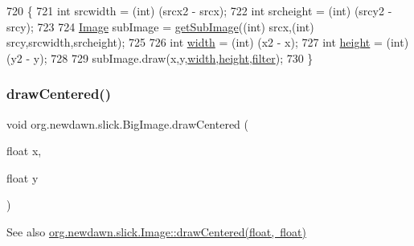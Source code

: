 \begin{DoxyCode}
720                                                                 \{   
721         \textcolor{keywordtype}{int} srcwidth = (int) (srcx2 - srcx);
722         \textcolor{keywordtype}{int} srcheight = (int) (srcy2 - srcy);
723 
724         \mbox{\hyperlink{classorg_1_1newdawn_1_1slick_1_1_image_a2c047fa669a8387f6c2d9bde33b3ee04}{Image}} subImage = \mbox{\hyperlink{classorg_1_1newdawn_1_1slick_1_1_big_image_a9384aa6b99cc0b45947a5b66bf2ab19c}{getSubImage}}((\textcolor{keywordtype}{int}) srcx,(\textcolor{keywordtype}{int}) srcy,srcwidth,srcheight);
725 
726         \textcolor{keywordtype}{int} \mbox{\hyperlink{classorg_1_1newdawn_1_1slick_1_1_image_a7d02c85e21b388428cfe5cc5c82714a1}{width}} = (int) (x2 - x);
727         \textcolor{keywordtype}{int} \mbox{\hyperlink{classorg_1_1newdawn_1_1slick_1_1_image_a54397a37823bc59ddc79ec70dc5cf226}{height}} = (int) (y2 - y);
728 
729         subImage.draw(x,y,\mbox{\hyperlink{classorg_1_1newdawn_1_1slick_1_1_image_a7d02c85e21b388428cfe5cc5c82714a1}{width}},\mbox{\hyperlink{classorg_1_1newdawn_1_1slick_1_1_image_a54397a37823bc59ddc79ec70dc5cf226}{height}},\mbox{\hyperlink{classorg_1_1newdawn_1_1slick_1_1_image_a1c6f09687817420f3762f32bb1c3ed76}{filter}});
730     \}
\end{DoxyCode}
\mbox{\label{classorg_1_1newdawn_1_1slick_1_1_big_image_a22ffb9ca81943b3496bd21acea3c980b}} 
\subsubsection{\texorpdfstring{draw\+Centered()}{drawCentered()}}
{\footnotesize\ttfamily void org.\+newdawn.\+slick.\+Big\+Image.\+draw\+Centered (\begin{DoxyParamCaption}\item[{float}]{x,  }\item[{float}]{y }\end{DoxyParamCaption})\hspace{0.3cm}{\ttfamily [inline]}}

\begin{DoxySeeAlso}{See also}
\mbox{\hyperlink{classorg_1_1newdawn_1_1slick_1_1_image_a4edd600dd696e709937dad16ced8c9b9}{org.\+newdawn.\+slick.\+Image\+::draw\+Centered(float, float)}} 
\end{DoxySeeAlso}

